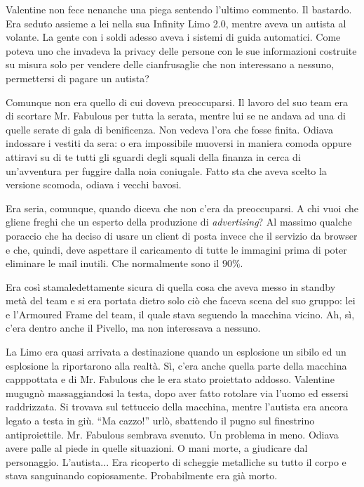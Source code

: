     Valentine non fece nenanche una piega sentendo l'ultimo commento. Il
    bastardo. Era seduto assieme a lei nella sua Infinity Limo 2.0, mentre
    aveva un autista al volante. La gente con i soldi adesso aveva i
    sistemi di guida automatici. Come poteva uno che invadeva la privacy
    delle persone con le sue informazioni costruite su misura solo per
    vendere delle cianfrusaglie che non interessano a nessuno, permettersi
    di pagare un autista?

    Comunque non era quello di cui doveva preoccuparsi. Il lavoro del suo
    team era di scortare Mr. Fabulous per tutta la serata, mentre lui se ne
    andava ad una di quelle serate di gala di benificenza. Non vedeva l'ora
    che fosse finita. Odiava indossare i vestiti da sera: o era impossibile
    muoversi in maniera comoda oppure attiravi su di te tutti gli sguardi
    degli squali della finanza in cerca di un'avventura per fuggire dalla
    noia coniugale. Fatto sta che aveva scelto la versione scomoda, odiava
    i vecchi bavosi.

    Era seria, comunque, quando diceva che non c'era da preoccuparsi. A chi
    vuoi che gliene freghi che un esperto della produzione di
    \emph{advertising}? Al massimo qualche poraccio che ha deciso di usare
    un client di posta invece che il servizio da browser e che, quindi,
    deve aspettare il caricamento di tutte le immagini prima di poter
    eliminare le mail inutili. Che normalmente sono il $90\%$.

    Era così stamaledettamente sicura di quella cosa che aveva messo in
    standby metà del team e si era portata dietro solo ciò che faceva scena
    del suo gruppo: lei e l'Armoured Frame del team, il quale stava
    seguendo la macchina vicino. Ah, sì, c'era dentro anche il Pivello, ma
    non interessava a nessuno.

    La Limo era quasi arrivata a destinazione quando un esplosione un
    sibilo ed un esplosione la riportarono alla realtà. Sì, c'era anche
    quella parte della macchina capppottata e di Mr. Fabulous che le era
    stato proiettato addosso. Valentine mugugnò massaggiandosi la testa,
    dopo aver fatto rotolare via l'uomo ed essersi raddrizzata. Si trovava
    sul tettuccio della macchina, mentre l'autista era ancora legato a
    testa in giù. ``Ma cazzo!'' urlò, sbattendo il pugno sul finestrino
    antiproiettile. Mr. Fabulous sembrava svenuto. Un problema in meno.
    Odiava avere palle al piede in quelle situazioni. O mani morte, a
    giudicare dal personaggio. L'autista... Era ricoperto di scheggie
    metalliche su tutto il corpo e stava sanguinando copiosamente.
    Probabilmente era già morto.

